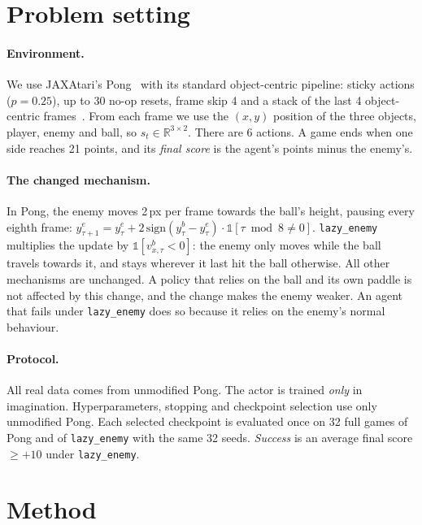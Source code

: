 \documentclass{article}
\newcommand{\lazy}{\texttt{lazy\_enemy}}
\begin{document}
\section{Problem setting}
\label{sec:setting}

\paragraph{Environment.} We use JAXAtari's Pong~\cite{jaxatari} with its standard object-centric
pipeline: sticky actions ($p=0.25$), up to 30 no-op resets, frame skip 4 and a stack of the last
4 object-centric frames~\cite{machado2018revisiting}. From each frame we use the $(x,y)$ position of the
three objects, player, enemy and ball, so $s_t\in\mathbb{R}^{3\times 2}$. There are 6 actions. A game
ends when one side reaches 21 points, and its \emph{final score} is the agent's points minus the
enemy's.

\paragraph{The changed mechanism.} In Pong, the enemy moves 2\,px per frame towards the ball's height,
pausing every eighth frame:
$y^{e}_{\tau+1} = y^{e}_\tau + 2\,\mathrm{sign}(y^{b}_\tau - y^{e}_\tau)\cdot\mathbb{1}[\tau \bmod 8 \neq 0]$.
\lazy{} multiplies the update by $\mathbb{1}[v^{b}_{x,\tau} < 0]$: the enemy only moves while the ball
travels towards it, and stays wherever it last hit the ball otherwise. All other mechanisms are
unchanged. A policy that relies on the ball and its own paddle is not affected by this change, and
the change makes the enemy weaker. An agent that fails under \lazy{} does so because it relies on the
enemy's normal behaviour.

\paragraph{Protocol.} All real data comes from unmodified Pong. The actor is trained
\emph{only} in imagination. Hyperparameters, stopping and checkpoint selection use only unmodified
Pong. Each selected checkpoint is evaluated once on 32 full games of Pong and of \lazy{} with the same
32 seeds. \emph{Success} is an average final score $\geq +10$ under \lazy{}.

\section{Method}
\label{sec:method}
\end{document}
